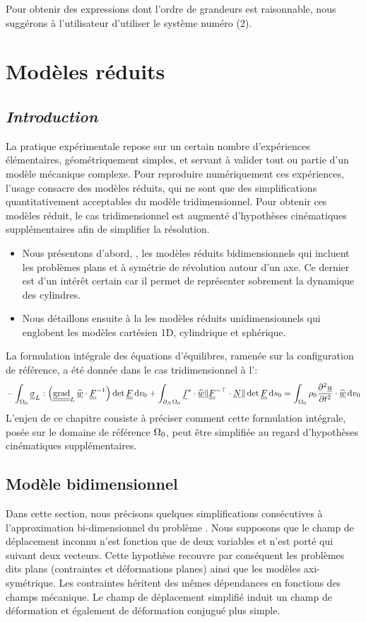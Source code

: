 \documentclass[10pt]{book}
\begin{document}
Pour obtenir des expressions dont l'ordre de grandeurs est raisonnable, nous suggérons à l'utilisateur d'utiliser le système numéro (2).
\chapter{Modèles réduits}\label{Chapitre:Modèles réduits}
\section*{\emph{Introduction}}
La pratique expérimentale repose sur un certain nombre d’expériences élémentaires, géométriquement simples, et servant à valider tout ou partie d'un modèle mécanique complexe. Pour reproduire numériquement ces expériences, l'usage consacre des modèles réduits, qui ne sont que des simplifications quantitativement acceptables du modèle tridimensionnel. Pour obtenir ces modèles réduit, le cas tridimensionnel est augmenté d'hypothèses cinématiques supplémentaires afin de simplifier la résolution. 
\begin{itemize}[label=$\star$]
\item Nous présentons d'abord, , les modèles réduits bidimensionnels qui incluent les problèmes plans et à symétrie de révolution autour d'un axe. Ce dernier est d'un intérêt certain car il permet de représenter sobrement la dynamique des cylindres.
\item Nous détaillons ensuite à la  les modèles réduits unidimensionnels qui englobent les modèles cartésien 1D, cylindrique et sphérique. 
\end{itemize}
La formulation intégrale des équations d'équilibres, ramenée sur la configuration de référence, a été donnée dans le cas tridimensionnel à l':
\begin{equation}
-\int_{\Configuration_{0}}\SC_{L}:\left(\tgrad_{L}\DepVirt\cdot\GT^{-1}\right)\det\GT\dvo+\int_{\dNOm_{0}}\FSurf\cdot\DepVirt\Vert\GT^{-\top}\cdot\NormaleInit\Vert\det\GT\dso=\int_{\Configuration_{0}}\rho_{0}\dfrac{\partial^{2}\Dep}{\partial t^{2}}\cdot\DepVirt\dvo
\label{eq:rappel_formulationvariationnelle_3D}
\end{equation}
L'enjeu de ce chapitre consiste à préciser comment cette formulation intégrale, posée sur le domaine de référence $\Omega_{0}$, peut être simplifiée au regard d'hypothèses cinématiques supplémentaires.
\section{Modèle bidimensionnel}\label{Section:Modèle bidimensionnel}
Dans cette section, nous précisons quelques simplifications consécutives à l'approximation \og bi-dimensionnel du problème \fg{}. Nous supposons que le champ de déplacement inconnu n'est fonction que de deux variables et n'est porté qui suivant deux vecteurs. Cette hypothèse recouvre par conséquent les problèmes dits plans (contraintes et déformations planes) ainsi que les modèles axi-symétrique. Les contraintes héritent des mêmes dépendances en fonctions des champs mécanique. Le champ de déplacement simplifié induit un champ de déformation et également de déformation conjugué plus simple.
\end{document}
